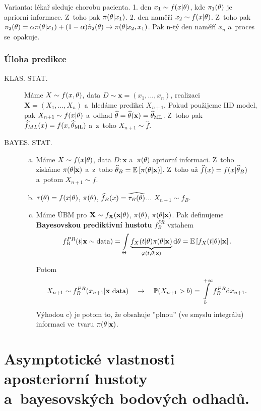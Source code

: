 \begin{example}
	Varianta: lékař sleduje chorobu pacienta. 1. den $x_1\sim f(x|\theta)$, kde $\pi_1(\theta)$ je apriorní informace. Z~toho pak $\pi(\theta|x_1)$. 2. den naměří $x_2\sim f(x|\theta)$. Z~toho pak $\pi_2(\theta)=\alpha\pi(\theta| x_1)+(1-\alpha)\tilde{\pi}_2(\theta)\to \pi(\theta|x_2,x_1)$. Pak n-tý den naměří $x_n$ a~proces se~opakuje.
\end{example}
\subsection*{Úloha predikce}
\begin{description}
	\item[KLAS. STAT.] Máme $X\sim f(x,\theta)$, data $D\sim\textbf{x}=(x_1,...,x_n)$, realizaci $\textbf{X}=(X_1,...,X_n)$ a~hledáme predikci $X_{n+1}$. Pokud použijeme IID model, pak $X_{n+1}\sim f(x|\theta)$ a~odhad $\widehat{\theta}=\widehat{\theta}(\textbf{x})=\widehat{\theta}_{\mathrm{ML}}$. Z~toho pak $\widehat{f}_{ML}(x)=f(x,\widehat{\theta}_\mathrm{ML})$ a~z~toho $X_{n+1}\sim\widehat{f}$.
	\item[BAYES. STAT.] \begin{enumerate}[a)]
		\item Máme $X\sim f(x|\theta)$, data $D:\textbf{x}$ a~$\pi(\theta)$ apriorní informaci. Z~toho získáme $\pi(\theta|\textbf{x})$ a~z~toho $\widehat{\theta}_B=\mathbb{E}\left[ \pi(\theta|\textbf{x}) \right]$. Z~toho už $\widehat{f}(x)=f(x|\widehat{\theta}_B)$ a~potom $X_{n+1}\sim\widehat{f}$.
		\item $\tau(\theta)=f(x|\theta)$, $\pi(\theta)$, $\widehat{f}_B(x)=\widehat{\tau_B(\theta)}$... $X_{n+1}\sim\widehat{f}_B$.
		\item \begin{define} Máme ÚBM pro $\textbf{X}\sim f_{\textbf{X}}(\textbf{x}|\theta)$, $\pi(\theta)$, $\pi(\theta|\textbf{x})$. Pak definujeme \textbf{Bayesovskou prediktivní hustotu} $f_B^{PR} $ vztahem
		$$ f_B^{PR}(t|\textbf{x}\sim\text{data})=\int\limits_{\Theta} \underbrace{f_X(t|\theta)\pi(\theta|\textbf{x})}_{\varphi(t,\theta|\textbf{x})}\mathrm{d}\theta=\mathbb{E}\left[ f_X(t|\theta)|\textbf{x} \right].$$
		\end{define}
		Potom
		$$ X_{n+1}\sim f_B^{PR}(x_{n+1}|\textbf{x}\text{ data})\quad\to\quad \mathbb{P}(X_{n+1}>b)=\int\limits_b^{+\infty}f_B^{PR}\mathrm{d} x_{n+1}.$$
		Výhodou c) je potom to, že obsahuje ''plnou'' (ve smyslu integrálu) informaci ve~tvaru $\pi(\theta|\textbf{x})$.
	\end{enumerate}
\end{description}

\chapter{Asymptotické vlastnosti aposteriorní hustoty a~bayesovských bodových odhadů.}

